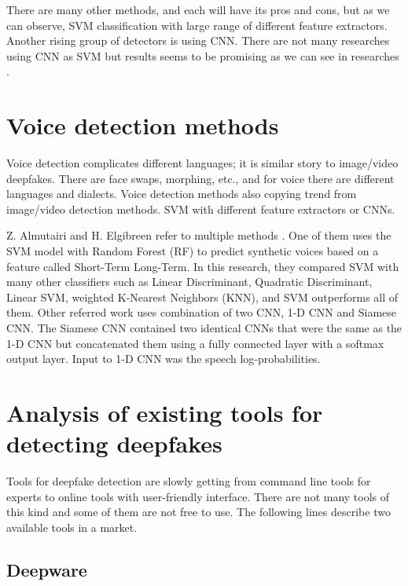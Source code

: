 There are many other methods, and each will have its pros and cons, but as we can observe, SVM classification with large range of different feature extractors. Another rising group of detectors is using CNN. There are not many researches using CNN as SVM but results seems to be promising as we can see in researches \cite{3DCNNArchitecturesAndAttentionMechanismsForDeepfakeDetection} \cite{CapsuleForensicsNetworksForDeepfakeDetection}.

\section{Voice detection methods}

Voice detection complicates different languages; it is similar story to image/video deepfakes. There are face swaps, morphing, etc., and for voice there are different languages and dialects. Voice detection methods also copying trend from image/video detection methods. SVM with different feature extractors or CNNs.

Z. Almutairi and H. Elgibreen refer to multiple methods \cite{ReviewOfModernAudioDeepfakeDetectionMethods}. One of them uses the SVM model with Random Forest (RF) to predict synthetic voices based on a feature called Short-Term Long-Term. In this research, they compared SVM with many other classifiers such as Linear Discriminant, Quadratic Discriminant, Linear SVM, weighted K-Nearest Neighbors (KNN), and SVM outperforms all of them. Other referred work uses combination of two CNN, 1-D CNN and Siamese CNN. The Siamese CNN contained two identical CNNs that were the same as the 1-D CNN but concatenated them using a fully connected layer with a softmax output layer. Input to 1-D CNN was the speech log-probabilities. \cite{ReviewOfModernAudioDeepfakeDetectionMethods}

\section{Analysis of existing tools for detecting deepfakes}

Tools for deepfake detection are slowly getting from command line tools for experts to online tools with user-friendly interface. There are not many tools of this kind and some of them are not free to use. The following lines describe two available tools in a market.

\subsection{Deepware}

